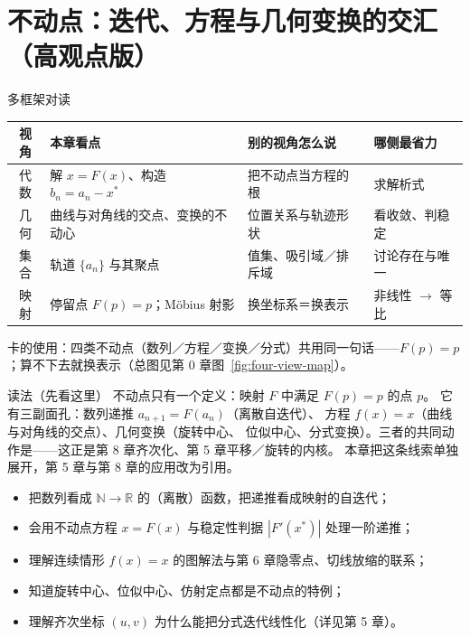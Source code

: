 
\section{不动点：迭代、方程与几何变换的交汇（高观点版）}

\begin{methodbox}{多框架对读}
\small
\begin{center}
\begin{tabular}{c|p{2.9cm}|p{5.0cm}|p{3.1cm}}
\toprule
视角 & 本章看点 & 别的视角怎么说 & 哪侧最省力 \\
\midrule
代数 & 解 $x=F(x)$、构造 $b_n=a_n-x^*$ & 把不动点当方程的根 & 求解析式 \\
几何 & 曲线与对角线的交点、变换的不动心 & 位置关系与轨迹形状 & 看收敛、判稳定 \\
集合 & 轨道 $\{a_n\}$ 与其聚点 & 值集、吸引域／排斥域 & 讨论存在与唯一 \\
映射 & 停留点 $F(p)=p$；Möbius 射影 & 换坐标系＝换表示 & 非线性 $\to$ 等比 \\
\bottomrule
\end{tabular}
\end{center}
卡的使用：四类不动点（数列／方程／变换／分式）共用同一句话——$F(p)=p$；算不下去就换表示（总图见第 0 章图~\ref{fig:four-view-map}）。
\end{methodbox}

\begin{warmupbox}{读法（先看这里）}
不动点只有一个定义：映射 $F$ 中满足 $F(p)=p$ 的点 $p$。
它有三副面孔：数列递推 $a_{n+1}=F(a_n)$（离散自迭代）、
方程 $f(x)=x$（曲线与对角线的交点）、几何变换（旋转中心、
位似中心、分式变换）。三者的共同动作是——这正是第 8 章齐次化、第 5 章平移／旋转的内核。
本章把这条线索单独展开，第 5 章与第 8 章的应用改为引用。
\end{warmupbox}

\begin{learnobjective}
\begin{itemize}
  \item 把数列看成 $\mathbb{N}\to\mathbb{R}$ 的（离散）函数，把递推看成映射的自迭代；
  \item 会用不动点方程 $x=F(x)$ 与稳定性判据 $|F'(x^*)|$ 处理一阶递推；
  \item 理解连续情形 $f(x)=x$ 的图解法与第 6 章隐零点、切线放缩的联系；
  \item 知道旋转中心、位似中心、仿射定点都是不动点的特例；
  \item 理解齐次坐标 $(u,v)$ 为什么能把分式迭代线性化（详见第 5 章）。
\end{itemize}
\end{learnobjective}

